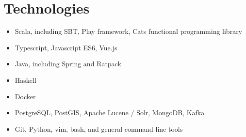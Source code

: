 \documentclass[10pt]{article}
\begin{document}
\section*{Technologies}
\begin{multicols}{2}
\begin{itemize}
    \itemsep0em
    \item Scala, including SBT, Play framework, Cats functional programming library
    \item Typescript, Javascript ES6, Vue.js
    \item Java, including Spring and Ratpack
    \item Haskell
    \item Docker
    \item PostgreSQL, PostGIS, Apache Lucene / Solr, MongoDB, Kafka
    \item Git, Python, vim, bash, and general command line tools
\end{itemize}
\end{multicols}
\end{document}
